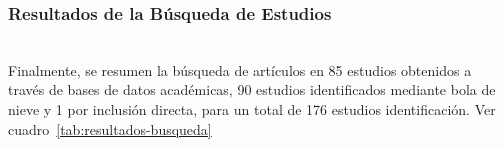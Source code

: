 \subsubsection{Resultados de la Búsqueda de Estudios}\label{subsubsec:resultados-busqueda}
\mbox{}\\
Finalmente, se resumen la búsqueda de artículos en 85 estudios obtenidos a través de bases de datos académicas, 90 estudios identificados mediante bola de nieve y 1 por inclusión directa, para un total de 176 estudios identificación. Ver cuadro~\ref{tab:resultados-busqueda}
\mbox{}\\